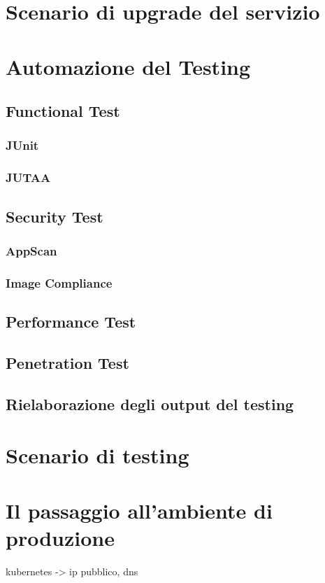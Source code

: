 \section{Scenario di upgrade del servizio}

\section{Automazione del Testing}
\subsection{Functional Test}
\subsubsection{JUnit}
\subsubsection{JUTAA}
\subsection{Security Test}
\subsubsection{AppScan}
\subsubsection{Image Compliance}
\subsection{Performance Test}
\subsection{Penetration Test}
\subsection{Rielaborazione degli output del testing}

\section{Scenario di testing}

\section{Il passaggio all'ambiente di produzione}
kubernetes -> ip pubblico, dns

